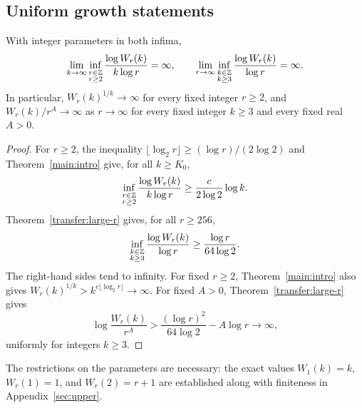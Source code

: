 \subsection{Uniform growth statements}

\begin{corollary}
\label{transfer:limits}
With integer parameters in both infima,
\[
 \lim_{k\to\infty}
 \inf_{\substack{r\in\mathbb Z\\r\ge2}}
 \frac{\log W_r(k)}{k\log r}=\infty,
 \qquad
 \lim_{r\to\infty}
 \inf_{\substack{k\in\mathbb Z\\k\ge3}}
 \frac{\log W_r(k)}{\log r}=\infty.
\]
In particular, $W_r(k)^{1/k}\to\infty$ for every fixed integer
$r\ge2$, and $W_r(k)/r^A\to\infty$ as $r\to\infty$ for every fixed
integer $k\ge3$ and every fixed real $A>0$.
\end{corollary}

\begin{proof}
For $r\ge2$, the inequality
$\lfloor\log_2r\rfloor\ge(\log r)/(2\log2)$ and
Theorem~\ref{main:intro} give, for all $k\ge K_0$,
\[
 \inf_{\substack{r\in\mathbb Z\\r\ge2}}
 \frac{\log W_r(k)}{k\log r}
 \ge\frac{c}{2\log2}\log k.
\]
Theorem~\ref{transfer:large-r} gives, for all $r\ge256$,
\[
 \inf_{\substack{k\in\mathbb Z\\k\ge3}}
 \frac{\log W_r(k)}{\log r}
 \ge\frac{\log r}{64\log2}.
\]
The right-hand sides tend to infinity.  For fixed $r\ge2$,
Theorem~\ref{main:intro} also gives
$W_r(k)^{1/k}>k^{c\lfloor\log_2r\rfloor}\to\infty$.
For fixed $A>0$, Theorem~\ref{transfer:large-r} gives
\[
 \log\frac{W_r(k)}{r^A}
 >\frac{(\log r)^2}{64\log2}-A\log r\longrightarrow\infty,
\]
uniformly for integers $k\ge3$.
\end{proof}

The restrictions on the parameters are necessary: the exact values
$W_1(k)=k$, $W_r(1)=1$, and $W_r(2)=r+1$ are established along with
finiteness in Appendix~\ref{sec:upper}.
